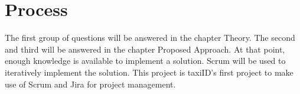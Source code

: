 \section{Process}

The first group of questions will be answered in the chapter Theory. The second and third will be answered in the chapter Proposed Approach. At that point, enough knowledge is available to implement a solution. Scrum will be used to iteratively implement the solution. This project is taxiID's first project to make use of Scrum and Jira for project management.
